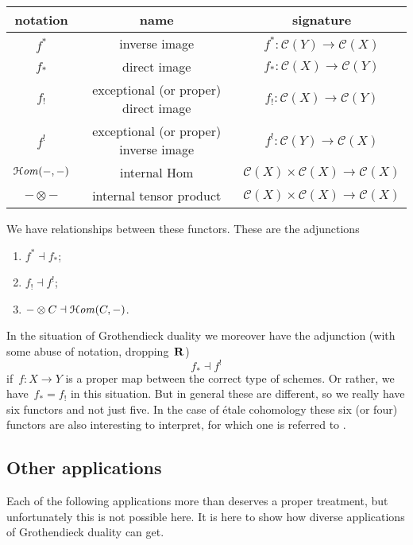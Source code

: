 \documentclass[10pt,a4paper]{article}
\begin{document}
\begin{center}
  \begin{tabular}{ccc}
    \toprule
    notation & name & signature \\\midrule
    $f^*$ & inverse image & $f^*\colon\mathcal{C}(Y)\to\mathcal{C}(X)$ \\
    $f_*$ & direct image & $f_*\colon\mathcal{C}(X)\to\mathcal{C}(Y)$ \\
    $f_!$ & exceptional (or proper) direct image & $f_!\colon\mathcal{C}(X)\to\mathcal{C}(Y)$ \\
    $f^!$ & exceptional (or proper) inverse image & $f^!\colon\mathcal{C}(Y)\to\mathcal{C}(X)$ \\
    $\operatorname{\mathcal{H}\mathit{om}}(-,-)$ & internal Hom & $\mathcal{C}(X)\times\mathcal{C}(X)\to\mathcal{C}(X)$ \\
    $-\otimes-$ & internal tensor product & $\mathcal{C}(X)\times\mathcal{C}(X)\to\mathcal{C}(X)$ \\
    \bottomrule
  \end{tabular}
\end{center}

We have relationships between these functors. These are the adjunctions
\begin{enumerate}
  \item $f^*\dashv f_*$;
  \item $f_!\dashv f^!$;
  \item $-\otimes C\dashv \operatorname{\mathcal{H}\mathit{om}}(C,-)$.
\end{enumerate}
In the situation of Grothendieck duality we moreover have the adjunction (with some abuse of notation, dropping~$\mathbf{R}$)
\begin{equation}
  f_*\dashv f^!
\end{equation}
if~$f\colon X\to Y$ is a proper map between the correct type of schemes. Or rather, we have~$f_*=f_!$ in this situation. But in general these are different, so we really have six functors and not just five. In the case of \'etale cohomology these six (or four) functors are also interesting to interpret, for which one is referred to \cite{milne-etale-cohomology}.

\subsection{Other applications}
Each of the following applications more than deserves a proper treatment, but unfortunately this is not possible here. It is here to show how diverse applications of Grothendieck duality can get.
\end{document}

